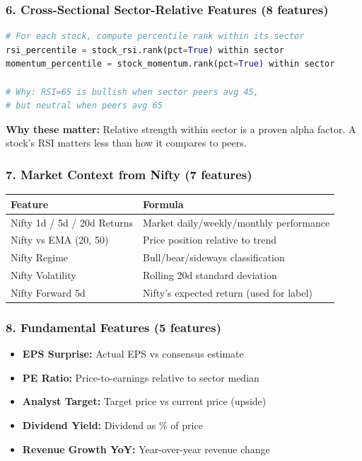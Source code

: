 \documentclass[11pt,a4paper]{article}
\begin{document}
\subsubsection{6. Cross-Sectional Sector-Relative Features (8 features)}

\begin{lstlisting}[language=Python, caption=Sector-Relative Ranking Example]
# For each stock, compute percentile rank within its sector
rsi_percentile = stock_rsi.rank(pct=True) within sector
momentum_percentile = stock_momentum.rank(pct=True) within sector

# Why: RSI=65 is bullish when sector peers avg 45,
# but neutral when peers avg 65
\end{lstlisting}

\textbf{Why these matter:} Relative strength within sector is a proven alpha factor. A stock's RSI matters less than how it compares to peers.

\subsubsection{7. Market Context from Nifty (7 features)}

\begin{table}[h]
\centering
\begin{tabular}{ll}
\toprule
\textbf{Feature} & \textbf{Formula} \\
\midrule
Nifty 1d / 5d / 20d Returns & Market daily/weekly/monthly performance \\
Nifty vs EMA (20, 50) & Price position relative to trend \\
Nifty Regime & Bull/bear/sideways classification \\
Nifty Volatility & Rolling 20d standard deviation \\
Nifty Forward 5d & Nifty's expected return (used for label) \\
\bottomrule
\end{tabular}
\end{table}

\subsubsection{8. Fundamental Features (5 features)}

\begin{itemize}
    \item \textbf{EPS Surprise:} Actual EPS vs consensus estimate
    \item \textbf{PE Ratio:} Price-to-earnings relative to sector median
    \item \textbf{Analyst Target:} Target price vs current price (upside)
    \item \textbf{Dividend Yield:} Dividend as \% of price
    \item \textbf{Revenue Growth YoY:} Year-over-year revenue change
\end{itemize}
\end{document}
